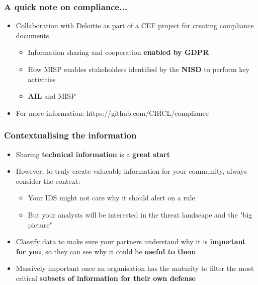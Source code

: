 \begin{frame}
\frametitle{A quick note on compliance...}
\begin{itemize}
	\item Collaboration with Deloitte as part of a CEF project for creating compliance documents
	\begin{itemize}
		\item Information sharing and cooperation {\bf enabled by GDPR}
		\item How MISP enables stakeholders identified by the {\bf NISD} to perform key activities
		\item {\bf AIL} and MISP
	\end{itemize}
	\item For more information: https://github.com/CIRCL/compliance
\end{itemize}
\end{frame}

\begin{frame}
\frametitle{Contextualising the information}
\begin{itemize}
    \item Sharing {\bf technical information} is a {\bf great start}
	\item However, to truly create valueable information for your community, always consider the context:
	\begin{itemize}
		\item Your IDS might not care why it should alert on a rule
		\item But your analysts will be interested in the threat landscape and the "big picture"
	\end{itemize}
    \item Classify data to make sure your partners understand why it is {\bf important for you}, so they can see why it could be {\bf useful to them}
    \item Massively important once an organisation has the maturity to filter the most critical {\bf subsets of information for their own defense}
\end{itemize}
\end{frame}

